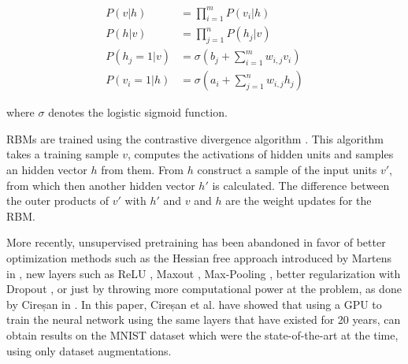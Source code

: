 \begin{align*}
	P(v|h) &= \prod_{i=1}^m P(v_i|h) \\
	P(h|v) &= \prod_{j=1}^n P(h_j|v) \\
	P(h_j=1|v) &= \sigma \left(b_j + \sum_{i=1}^m w_{i,j} v_i \right) \\ 
	P(v_i=1|h) &= \sigma \left(a_i + \sum_{j=1}^n w_{i,j} h_j \right)
\end{align*}

where $ \sigma $ denotes the logistic sigmoid function.

RBMs are trained using the contrastive divergence algorithm \cite{hinton2002training}. This algorithm takes a training sample $ v $, computes the activations of hidden units and samples an hidden vector $h$ from them. From $h$ construct a sample of the input units $ v'$, from which then another hidden vector $ h' $ is calculated. The difference between the outer products of $ v' $ with $ h' $ and $ v $ and $ h $ are the weight updates for the RBM. 

More recently, unsupervised pretraining has been abandoned in favor of better optimization methods such as the Hessian free approach introduced by Martens in \cite{martens2010deep}, new layers such as ReLU \cite{nair2010rectified}, Maxout \cite{goodfellow2013maxout}, Max-Pooling \cite{scherer2010evaluation}, better regularization with Dropout \cite{hinton2012improving}, or just by throwing more computational power at the problem, as done by Cireșan in \cite{Cire_an_2010}. In this paper, Cireșan et al. have showed that using a GPU to train the neural network using the same layers that have existed for 20 years, can obtain results on the MNIST dataset which were the state-of-the-art at the time, using only dataset augmentations. 